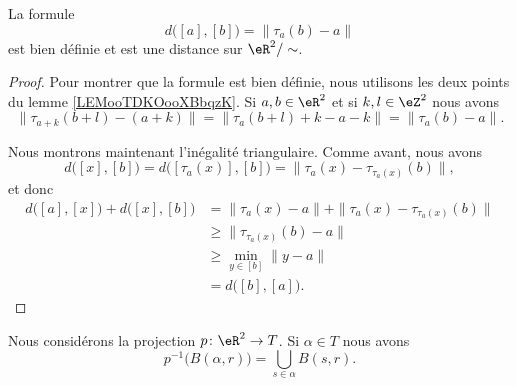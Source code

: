 \begin{proposition}	\label{PROPooUVTXooYxwdtb}
	La formule
	\begin{equation}
		d\big( [a],[b] \big)=\| \tau_a(b)-a \|
	\end{equation}
	est bien définie et est une distance sur \( \eR^2/\sim\).
\end{proposition}

\begin{proof}
	Pour montrer que la formule est bien définie, nous utilisons les deux points du lemme \ref{LEMooTDKOooXBbqzK}. Si \( a,b\in \eR^2\) et si \( k,l\in \eZ^2\) nous avons
	\begin{equation}
		\| \tau_{a+k}(b+l)-(a+k) \|=\| \tau_{a}(b+l)+k-a-k \|=\| \tau_a(b)-a \|.
	\end{equation}

	Nous montrons maintenant l'inégalité triangulaire. Comme avant, nous avons
	\begin{equation}
		d\big( [x],[b] \big)=d\big( [\tau_a(x)],[b] \big)=\| \tau_a(x)-\tau_{\tau_a(x)}(b) \|,
	\end{equation}
	et donc
	\begin{subequations}
		\begin{align}
			d\big( [a],[x] \big)+d\big( [x],[b] \big) & = \| \tau_a(x)-a \|+\| \tau_a(x)-\tau_{\tau_a(x)}(b) \| \\
			                                          & \geq\| \tau_{\tau_a(x)}(b)-a \|                         \\
			                                          & \geq \min_{y\in[b]}\| y-a \|                            \\
			                                          & =d\big( [b],[a] \big).
		\end{align}
	\end{subequations}
\end{proof}

\begin{lemma}	\label{LEMooDKGCooBIPJqn}
	Nous considérons la projection \(p \colon \eR^2\to T  \). Si \( \alpha\in T\) nous avons
	\begin{equation}
		p^{-1}\big( B(\alpha,r) \big)=\bigcup_{s\in \alpha}B(s,r).
	\end{equation}
\end{lemma}

